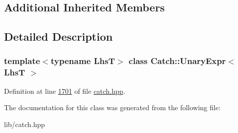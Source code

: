 \subsection*{Additional Inherited Members}


\subsection{Detailed Description}
\subsubsection*{template$<$typename LhsT$>$\newline
class Catch\+::\+Unary\+Expr$<$ Lhs\+T $>$}



Definition at line \mbox{\hyperlink{catch_8hpp_source_l01701}{1701}} of file \mbox{\hyperlink{catch_8hpp_source}{catch.\+hpp}}.



The documentation for this class was generated from the following file\+:\begin{DoxyCompactItemize}
\item 
lib/catch.\+hpp\end{DoxyCompactItemize}
